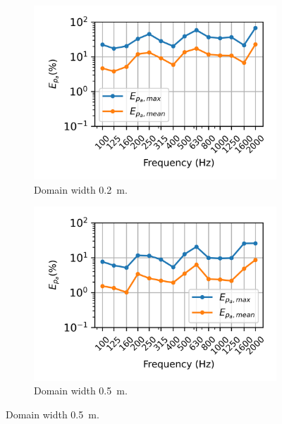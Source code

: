 \begin{figure}
	\centering
	\begin{subfigure}[b]{0.48\textwidth}
		\centering
		\includegraphics{fig/chap4/simulation_domain/width_0pt2m.png}
		\caption{Domain width \SI{0.2}{\meter}.}
	\end{subfigure}
	\hfill
	\begin{subfigure}[b]{0.48\textwidth}
		\centering
		\includegraphics{fig/chap4/simulation_domain/width_0pt5m.png}
		\caption{Domain width \SI{0.5}{\meter}.}
	\end{subfigure}
	

\end{figure}
